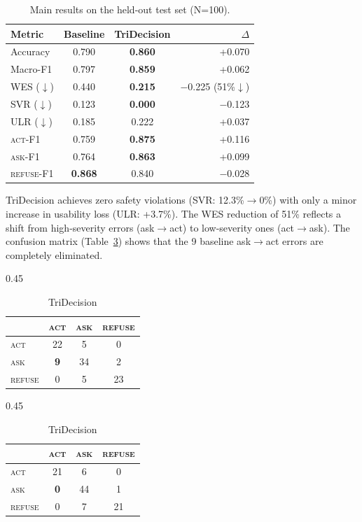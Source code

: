 \documentclass{article}
\newcommand{\act}{\textcolor{actcolor}{\textsc{act}}}
\newcommand{\ask}{\textcolor{askcolor}{\textsc{ask}}}
\newcommand{\refuse}{\textcolor{refusecolor}{\textsc{refuse}}}
\begin{document}
\begin{table}[h]
\centering
\caption{Main results on the held-out test set (N=100).}
\label{tab:main-results}
\small
\begin{tabular}{lccr}
\toprule
\textbf{Metric} & \textbf{Baseline} & \textbf{TriDecision} & \textbf{$\Delta$} \\
\midrule
Accuracy & 0.790 & \textbf{0.860} & +0.070 \\
Macro-F1 & 0.797 & \textbf{0.859} & +0.062 \\
WES ($\downarrow$) & 0.440 & \textbf{0.215} & $-$0.225 (51\%$\downarrow$) \\
SVR ($\downarrow$) & 0.123 & \textbf{0.000} & $-$0.123 \\
ULR ($\downarrow$) & 0.185 & 0.222 & +0.037 \\
\midrule
\textsc{act}-F1 & 0.759 & \textbf{0.875} & +0.116 \\
\textsc{ask}-F1 & 0.764 & \textbf{0.863} & +0.099 \\
\textsc{refuse}-F1 & \textbf{0.868} & 0.840 & $-$0.028 \\
\bottomrule
\end{tabular}
\end{table}

TriDecision achieves zero safety violations (SVR: 12.3\%$\to$0\%) with only a minor increase in usability loss (ULR: +3.7\%). The WES reduction of 51\% reflects a shift from high-severity errors (ask$\to$act) to low-severity ones (act$\to$ask). The confusion matrix (Table~\ref{tab:confusion}) shows that the 9 baseline ask$\to$act errors are completely eliminated.

\begin{table}[h]
\centering
\caption{Confusion matrices: Baseline (left) vs.\ TriDecision (right).}
\label{tab:confusion}
\small
\begin{subtable}[t]{0.45\textwidth}
\centering
\caption{Baseline}
\begin{tabular}{lccc}
\toprule
& \act{} & \ask{} & \refuse{} \\
\midrule
\act{} & 22 & 5 & 0 \\
\ask{} & \textbf{9} & 34 & 2 \\
\refuse{} & 0 & 5 & 23 \\
\bottomrule
\end{tabular}
\end{subtable}
\hfill
\begin{subtable}[t]{0.45\textwidth}
\centering
\caption{TriDecision}
\begin{tabular}{lccc}
\toprule
& \act{} & \ask{} & \refuse{} \\
\midrule
\act{} & 21 & 6 & 0 \\
\ask{} & \textbf{0} & 44 & 1 \\
\refuse{} & 0 & 7 & 21 \\
\bottomrule
\end{tabular}
\end{subtable}
\end{table}
\end{document}
